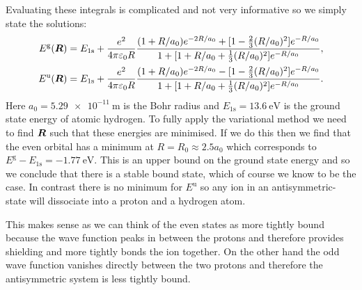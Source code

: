 \documentclass[a4paper]{article}
\newcommand{\gerade}{\mathrm{g}}
\newcommand{\ungerade}{\mathrm{u}}
\begin{document}
    Evaluating these integrals is complicated and not very informative so we simply state the solutions:
    \begin{align*}
        E^{\gerade}(\vv{R}) &= E_{1\mathrm{s}} + \frac{e^2}{4\pi\varepsilon_0R} \frac{(1 + R/a_0)e^{-2R/a_0} + [1 - \tfrac{2}{3}(R/a_0)^2]e^{-R/a_0}}{1 + [1 + R/a_0 + \tfrac{1}{3}(R/a_0)^2]e^{-R/a_0}},\\
        E^{\ungerade}(\vv{R}) &= E_{1\mathrm{s}} + \frac{e^2}{4\pi\varepsilon_0R} \frac{(1 + R/a_0)e^{-2R/a_0} - [1 - \tfrac{2}{3}(R/a_0)^2]e^{-R/a_0}}{1 + [1 + R/a_0 + \tfrac{1}{3}(R/a_0)^2]e^{-R/a_0}}.
    \end{align*}
    Here \(a_0 = \SI{5.29e-11}{\metre}\) is the Bohr radius and \(E_{1\mathrm{s}} = \SI{13.6}{\electronvolt}\) is the ground state energy of atomic hydrogen.
    To fully apply the variational method we need to find \(\bm{R}\) such that these energies are minimised.
    If we do this then we find that the even orbital has a minimum at \(R = R_0 \approx 2.5a_0\) which corresponds to \(E^{\gerade} - E_{1\mathrm{s}} = -\SI{1.77}{\electronvolt}\).
    This is an upper bound on the ground state energy and so we conclude that there is a stable bound state, which of course we know to be the case.
    In contrast there is no minimum for \(E^{\ungerade}\) so any  ion in an antisymmetric-state will dissociate into a proton and a hydrogen atom.
    
    This makes sense as we can think of the even states as more tightly bound because the wave function peaks in between the protons and therefore provides shielding and more tightly bonds the ion together.
    On the other hand the odd wave function vanishes directly between the two protons and therefore the antisymmetric system is less tightly bound.
    
\end{document}
